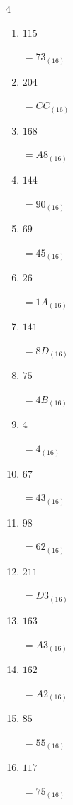 \begin{multicols}{4}
\begin{enumerate}
        $=E_{(16)}$

  \item $115$

        $=73_{(16)}$

  \item $204$

        $=CC_{(16)}$

  \item $168$

        $=A8_{(16)}$

  \item $144$

        $=90_{(16)}$

  \item $69$

        $=45_{(16)}$

  \item $26$

        $=1A_{(16)}$

  \item $141$

        $=8D_{(16)}$

  \item $75$

        $=4B_{(16)}$

  \item $4$

        $=4_{(16)}$

  \item $67$

        $=43_{(16)}$

\columnbreak %

  \item $98$

        $=62_{(16)}$

  \item $211$

        $=D3_{(16)}$

  \item $163$

        $=A3_{(16)}$

  \item $162$

        $=A2_{(16)}$

  \item $85$

        $=55_{(16)}$

  \item $117$

        $=75_{(16)}$


\end{enumerate}
\end{multicols}
